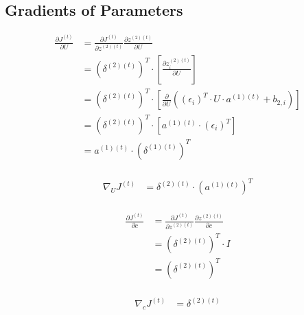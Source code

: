 \documentclass{article}
\begin{document}
	\subsection{Gradients of Parameters}
	\begin{equation}
	\begin{aligned}
		\frac{\partial J^{(t)}}{\partial U} &= \frac{\partial J^{(t)}}{\partial z^{(2)(t)}} 
		\frac{\partial z^{(2)(t)}}{\partial U} \\
		&= (\delta^{(2)(t)})^T \cdot \left[\frac{\partial z^{(2)(t)}_i}{\partial U}\right]\\
		&= (\delta^{(2)(t)})^T \cdot \left[\frac{\partial }{\partial U} ((\epsilon_i)^T \cdot U \cdot a^{(1)(t)} + b_{2,i})\right]\\
		&= (\delta^{(2)(t)})^T \cdot \left[a^{(1)(t)} \cdot (\epsilon_i)^T\right]\\	
		&= a^{(1)(t)} \cdot (\delta^{(1)(t)})^T\\
	\end{aligned}
	\end{equation}
	
	\begin{equation}
	\begin{aligned}
		\nabla_U J^{(t)} &= \delta^{(2)(t)} \cdot (a^{(1)(t)})^T\\
	\end{aligned}
	\end{equation}
	
	\begin{equation}
	\begin{aligned}
		\frac{\partial J^{(t)}}{\partial c} &= \frac{\partial J^{(t)}}{\partial z^{(2)(t)}} 
		\frac{\partial z^{(2)(t)}}{\partial c} \\
		&= (\delta^{(2)(t)})^T \cdot I \\
		&= (\delta^{(2)(t)})^T \\
	\end{aligned}
	\end{equation}
	
	\begin{equation}
	\begin{aligned}
		\nabla_{c} J^{(t)} &= \delta^{(2)(t)} \\
	\end{aligned}
	\end{equation}
	
\end{document}
